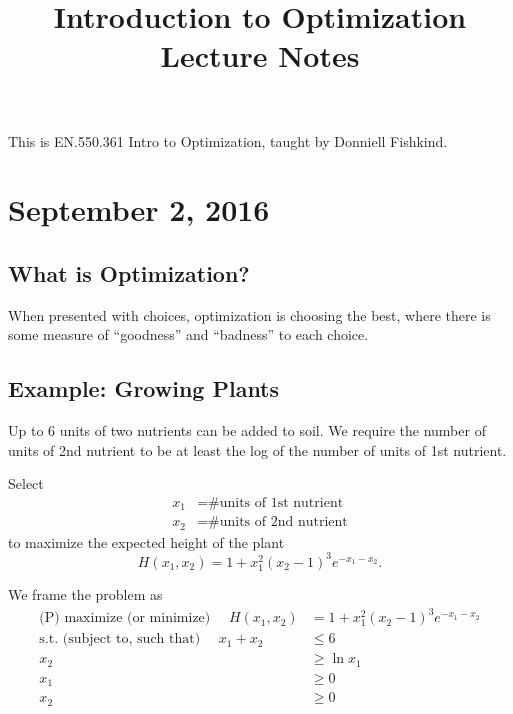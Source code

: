 \documentclass{article}
\begin{document}
\title{Introduction to Optimization Lecture Notes}
\maketitle
	This is EN.550.361 Intro to Optimization, taught by Donniell Fishkind.
\thispagestyle{fancy}

\tableofcontents

\newpage

\section{September 2, 2016}
\subsection{What is Optimization?}

\begin{definition}
	When presented with choices, optimization is choosing the best, where there is some measure of ``goodness'' and ``badness'' to each choice.
\end{definition}

\subsection{Example: Growing Plants}
\begin{example}
	Up to 6 units of two nutrients can be added to soil. We require the number of units of 2nd nutrient to be at least the log of the number of units of 1st nutrient.

Select \begin{align*}
		x_1 &= \text{\# units of 1st nutrient} \\
		x_2 &= \text{\# units of 2nd nutrient}
	\end{align*} to maximize the expected height of the plant 
	\[ H(x_1, x_2) = 1 + x_1^2(x_2-1)^3e^{-x_1-x_2}. \]
\end{example}

We frame the problem as 
\begin{align*}
	\text{(P) maximize (or minimize) } \quad H(x_1, x_2) &= 1 + x_1^2(x_2-1)^3e^{-x_1-x_2} \\
	\text{s.t. (subject to, such that) } \quad x_1 + x_2 &\le 6 \\
	x_2 &\ge \ln{x_1} \\
	x_1 &\ge 0 \\
	x_2 &\ge 0
\end{align*}
\end{document}
